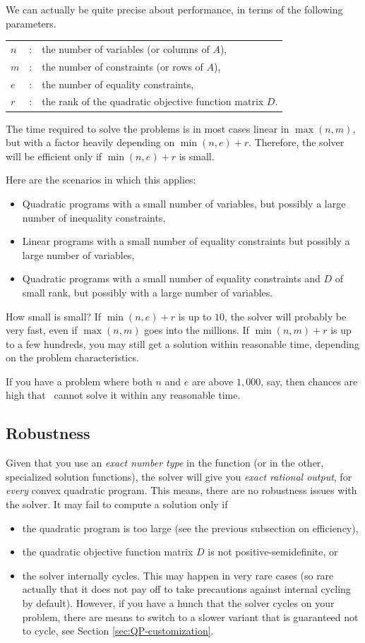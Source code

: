 We can actually be quite precise about performance, in terms of the 
following parameters.
\begin{tabular}{lcl}
$n$ &: & the number of variables (or columns of $A$),\\
$m$ &: & the number of constraints (or rows of $A$),\\
$e$ &: & the number of equality constraints,\\
$r$ &: & the rank of the quadratic objective function matrix $D$.
\end{tabular}

The time required to solve the problems is in most cases linear in 
$\max(n,m)$, but with a factor heavily depending on $\min(n,e)+r$.
Therefore, the solver will be efficient only if $\min(n,e)+r$ is 
small.

Here are the scenarios in which this applies:
\begin{itemize}
\item Quadratic programs with a small number of variables, but
  possibly a large number of inequality constraints,
\item Linear programs with a small number of equality constraints but
  possibly a large number of variables,
\item Quadratic programs with a small number of equality constraints and
  $D$ of small rank, but possibly with a large number of variables.
\end{itemize} 

How small is small? If $\min(n,e)+r$ is up to $10$, the solver will
probably be very fast, even if $\max(n,m)$ goes into the millions. 
If $\min(n,m)+r$ is up to a few hundreds, you may still get a solution 
within reasonable time, depending on the problem characteristics.

If you have a problem where both $n$ and $e$ are above
$1,000$, say, then chances are high that \cgal\ cannot solve it
within any reasonable time.

\subsection{Robustness\label{sec:QP-robustness}}
Given that you use an \emph{exact number type} in the function
 (or in the other, specialized 
solution functions),  the solver
will give you \emph{exact rational output}, for \emph{every}
convex quadratic program. This means, there are no robustness
issues with the solver. It may fail to compute a solution only if
\begin{itemize}
\item the quadratic program is too large (see the previous subsection 
on efficiency), 
\item the quadratic objective function matrix $D$ is not 
positive-semidefinite, or
\item the solver internally cycles. This may happen in very rare
cases (so rare actually that it does not pay off to take
precautions against internal cycling by default). However, if
you have a hunch that the solver cycles on your problem,
there are means to switch to a slower variant that is guaranteed
not to cycle, see Section \ref{sec:QP-customization}.
\end{itemize}


